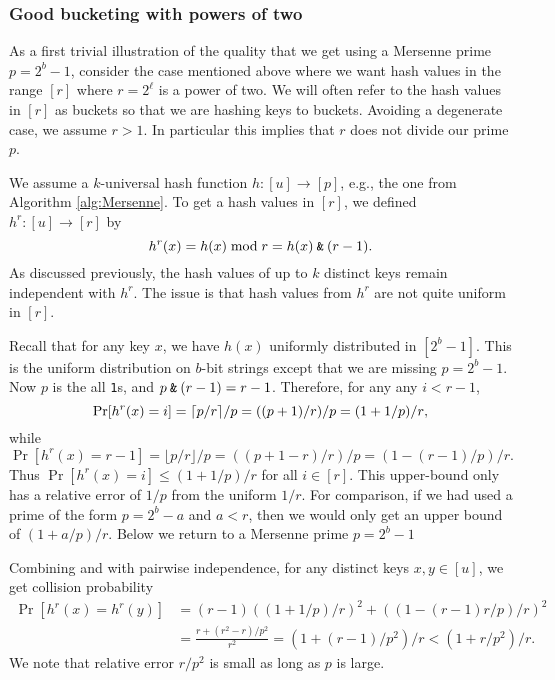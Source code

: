 \subsubsection{Good bucketing with powers of two}\label{sec:power-of-two}
As a first trivial illustration of the quality that we get using a
Mersenne prime $p=2^b-1$, consider the case mentioned above where we
want hash values in the range $[r]$ where $r=2^\ell$ is a power of
two. We will often refer to the hash values in $[r]$ as buckets so
that we are hashing keys to buckets. Avoiding a degenerate case, we
assume $r>1$. In particular this implies that $r$ does not divide our
prime $p$.

We assume a $k$-universal hash function $h:[u]\to[p]$, e.g.,
the one from Algorithm \ref{alg:Mersenne}. To get a hash values in $[r]$,
we defined $h^r:[u]\to[r]$ by
\[h^r(x)=h(x)\bmod r=h(x)\mathbin{\texttt{\&}} (r-1).\]
As discussed previously, the hash values of up to $k$ distinct keys remain
independent with $h^r$. The issue is that hash values from 
$h^r$ are not quite uniform in $[r]$.

Recall that for any key $x$, we have $h(x)$ uniformly distributed in $[2^b-1]$.
This is the uniform distribution on $b$-bit strings except that we are
missing $p=2^b-1$. Now $p$ is the all \texttt{1}s, and 
$p\mathbin{\texttt{\&}} (r-1)=r-1$. Therefore, for any 
any $i<r-1$,
\begin{equation}\label{eq:coll-ell<r-1}
   \Pr[h^r(x)=i]=\lceil p/r\rceil/p=((p+1)/r)/p
   =(1+1/p)/r\textnormal,
\end{equation}
while 
\begin{equation}\label{eq:coll-ell=r-1}
   \Pr[h^r(x)=r-1]=\lfloor p/r\rfloor/p=((p+1-r)/r)/p
   =(1-(r-1)/p)/r.
\end{equation}
Thus $\Pr[h^r(x)=i]\leq (1+1/p)/r$ for all $i\in[r]$. This upper-bound
only has a relative error of $1/p$ from the uniform $1/r$. For
comparison, if we had used a prime of the form $p=2^b-a$ and $a<r$, then
we would only get an upper bound of $(1+a/p)/r$. Below we return
to a Mersenne prime $p=2^b-1$

Combining  and  with
pairwise independence, for any distinct keys $x,y\in [u]$, we get
collision probability
\begin{align}
   \Pr[h^r(x)=h^r(y)]
      &=(r-1)((1+1/p)/r)^2+((1-(r-1)r/p)/r)^2\nonumber
      \\[.5ex]&=
      \frac{r +(r^2-r)/p^2}{r^2}
      =(1+(r-1)/p^2)/r
      <(1+r/p^2)/r.\label{eq:coll}
\end{align}
We note that relative error $r/p^2$ is small as long as $p$ is
large.

